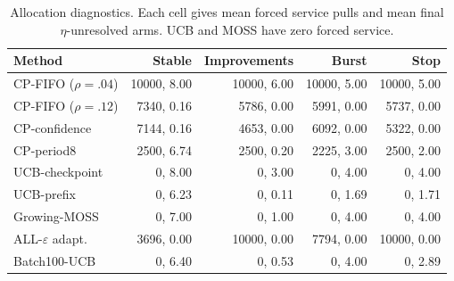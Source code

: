 \begin{table}[t]
\centering
\caption{Allocation diagnostics. Each cell gives mean forced service pulls and mean final $\eta$-unresolved arms. UCB and MOSS have zero forced service.}
\label{tab:allocation}
\small
\begin{tabular}{lrrrr}
\toprule
Method & Stable & Improvements & Burst & Stop \\
\midrule
CP-FIFO ($\rho=.04$) & 10000, 8.00 & 10000, 6.00 & 10000, 5.00 & 10000, 5.00 \\
CP-FIFO ($\rho=.12$) & 7340, 0.16 & 5786, 0.00 & 5991, 0.00 & 5737, 0.00 \\
CP-confidence & 7144, 0.16 & 4653, 0.00 & 6092, 0.00 & 5322, 0.00 \\
CP-period8 & 2500, 6.74 & 2500, 0.20 & 2225, 3.00 & 2500, 2.00 \\
UCB-checkpoint & 0, 8.00 & 0, 3.00 & 0, 4.00 & 0, 4.00 \\
UCB-prefix & 0, 6.23 & 0, 0.11 & 0, 1.69 & 0, 1.71 \\
Growing-MOSS & 0, 7.00 & 0, 1.00 & 0, 4.00 & 0, 4.00 \\
ALL-$\varepsilon$ adapt. & 3696, 0.00 & 10000, 0.00 & 7794, 0.00 & 10000, 0.00 \\
Batch100-UCB & 0, 6.40 & 0, 0.53 & 0, 4.00 & 0, 2.89 \\
\bottomrule
\end{tabular}
\end{table}
